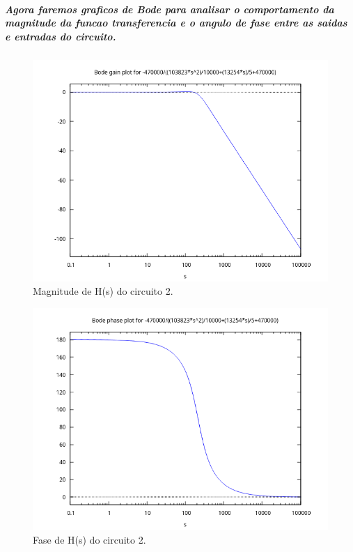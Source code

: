 \documentclass[12pt,twoside, a4paper, twocolumn]{article}
\begin{document}
\subparagraph*{Agora faremos graficos de Bode para analisar o comportamento da magnitude da funcao transferencia e o angulo de fase entre as saidas e entradas do circuito.}

\subparagraph*{}

\begin{figure}[h]
    \centering
    \includegraphics[width=1\columnwidth]{images/H2bodegain.png}
    \caption{Magnitude de H(s) do circuito 2.}
\end{figure}

\begin{figure}[h]
    \centering
    \includegraphics[width=1\columnwidth]{images/H2bodephase.png}
    \caption{Fase de H(s) do circuito 2.}
\end{figure}
\end{document}
